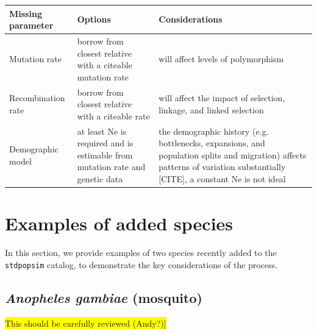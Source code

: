 \documentclass[hidelinks]{article}
\newcommand{\stdpopsim}{\texttt{stdpopsim}\xspace}
\begin{document}
\begin{table}[htb]
	\captionof{table}{Guide to missing parameters. \\
	\colorbox{yellow}{[TODO: reconsider table. Either clarify considerations or just defer to the text, which covers this quite clearly.}
	\colorbox{yellow}{Current version is too vague.}
} \label{tab:param-mod}
	\begin{tabular}{p{1.5in}p{2.2in}p{2.2in}}
			\hline
			Missing parameter  & Options & Considerations \\
			\hline
			Mutation rate      &
			borrow from closest relative with a citeable mutation rate &
			will affect levels of polymorphism \\                                                                                          						\hline
			Recombination rate &
			borrow from closest relative with a citeable rate &
			will affect the impact of selection, linkage, and linked selection
			\\
			\hline
			Demographic model &
			at least Ne is required and is estimable from mutation rate and genetic data     &
			the demographic history (e.g. bottlenecks, expansions, and population splits and migration) affects patterns of variation substantially {[}CITE{]}, a constant Ne is not ideal \\
			\hline
	\end{tabular}
\end{table}


\hypertarget{sec5}{%
	\section*{Examples of added species}\label{sec:examples}}

In this section, we provide examples of two species recently added to the \stdpopsim catalog,
to demonstrate the key considerations of the process.

\hypertarget{ano-gambea}{%
	\subsection*{\texorpdfstring{\emph{Anopheles gambiae} (mosquito)}{Anopheles gambiae (mosquito)}}\label{AnoGam}}

\colorbox{yellow}{This should be carefully reviewed (Andy?)]}
\end{document}

